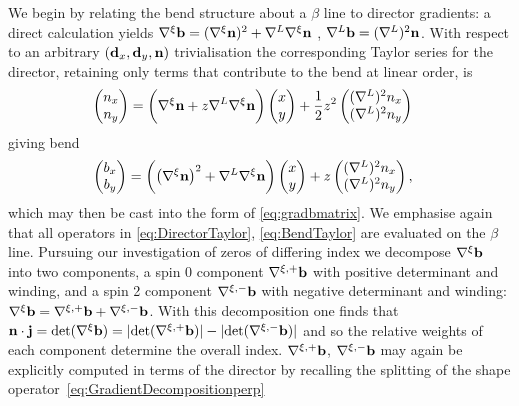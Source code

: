 {We begin by relating the bend structure about a $\beta$ line to director gradients: a direct calculation yields $\nabla^\xi \mathbf{b} = (\nabla^\xi{\bf n})^2+\nabla^L \nabla^\xi{\bf n}$ , $\nabla^L \mathbf{b} = (\nabla^L)^2 \mathbf{n}$. With respect to an arbitrary $(\mathbf{d}_x,\mathbf{d}_y, \mathbf{n})$ trivialisation the corresponding Taylor series for the director, retaining only terms that contribute to the bend at linear order, is
\begin{align}
\begin{pmatrix} n_x \\ n_y \end{pmatrix} & = \biggl( \nabla^\xi {\bf n}  + z  \nabla^L\nabla^\xi {\bf n} \biggr) \begin{pmatrix} x \\ y \end{pmatrix} + \frac{1}{2} z^2 \begin{pmatrix} (\nabla^L)^2 n_x \\ (\nabla^L)^2 n_y \end{pmatrix}
\label{eq:DirectorTaylor}
\end{align}
giving bend
\begin{align}
\begin{pmatrix}b_x \\ b_y\end{pmatrix} & =
\biggl(\left(\nabla^\xi {\bf n}\right)^2+ \nabla^L\nabla^\xi {\bf n} \biggr) \begin{pmatrix} x \\ y \end{pmatrix}
 + z \begin{pmatrix}(\nabla^L)^2 n_x \\ (\nabla^L)^2 n_y \end{pmatrix},
\label{eq:BendTaylor}
\end{align}
which may then be cast into the form of \eqref{eq:gradbmatrix}. We emphasise again that all operators in \eqref{eq:DirectorTaylor}, \eqref{eq:BendTaylor} are evaluated on the $\beta$ line. Pursuing our investigation of zeros of differing index we decompose $\nabla^\xi \mathbf{b}$ into two components, a spin 0 component $\nabla^{\xi, +} \mathbf{b}$ with positive determinant and winding, and a spin 2 component $\nabla^{\xi, -} \mathbf{b}$ with negative determinant and winding: $\nabla^\xi \mathbf{b} = \nabla^{\xi,+} \mathbf{b} + \nabla^{\xi,-} \mathbf{b}$. With this decomposition one finds that $\mathbf{n} \cdot \mathbf{j} = \mathrm{det}(\nabla^\xi \mathbf{b}) = |\mathrm{det}(\nabla^{\xi, +} \mathbf{b})| - |\mathrm{det}(\nabla^{\xi, -} \mathbf{b})| $ and so the relative weights of each component determine the overall index. $\nabla^{\xi,+} \mathbf{b}$, $\nabla^{\xi,-} \mathbf{b}$ may again be explicitly computed in terms of the director by recalling the splitting of the shape operator~\eqref{eq:GradientDecompositionperp}
}
